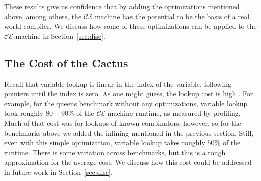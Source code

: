 These results give us confidence that by adding the optimizations mentioned
above, among others, the $\mathcal{CE}$ machine has the potential to be the
basis of a real world compiler. We discuss how some of these optimizations can
be applied to the $\mathcal{CE}$ machine in Section~\ref{sec:disc}.

\subsection{The Cost of the Cactus}

Recall that variable lookup is linear in the index of the variable, following
pointers until the index is zero. As one might guess, the lookup cost is high
. For example, for the queens benchmark without any optimizations, variable
lookup took roughly $80-90\%$ of the $\mathcal{CE}$ machine runtime, as measured
by profiling. Much of that cost was for lookups of known combinators, however,
so for the benchmarks above we added the inlining mentioned in the previous
section. Still, even with this simple optimization, variable lookup takes
roughly $50\%$ of the runtime. There is some variation across benchmarks, but
this is a rough approximation for the average cost. We discuss how this cost
could be addressed in future work in Section~\ref{sec:disc}.


